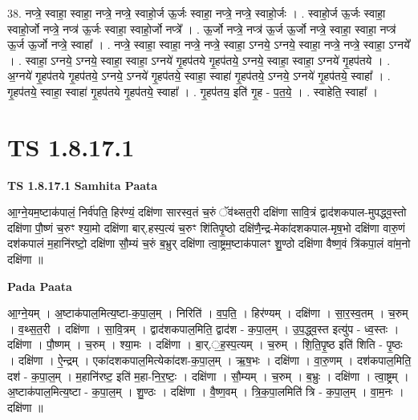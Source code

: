 \documentclass[17pt]{extarticle}
\begin{document}
38. नप्त्रे॒ स्वाहा॒ स्वाहा॒ नप्त्रे॒ नप्त्रे॒ स्वाहो॒र्ज ऊ॒र्जः स्वाहा॒ नप्त्रे॒ नप्त्रे॒ स्वाहो॒र्जः । . स्वाहो॒र्ज ऊ॒र्जः स्वाहा॒ स्वाहो॒र्जो नप्त्रे॒ नप्त्र॑ ऊ॒र्जः स्वाहा॒ स्वाहो॒र्जो नप्त्रे᳚ । . ऊ॒र्जो नप्त्रे॒ नप्त्र॑ ऊ॒र्ज ऊ॒र्जो नप्त्रे॒ स्वाहा॒ स्वाहा॒ नप्त्र॑ ऊ॒र्ज ऊ॒र्जो नप्त्रे॒ स्वाहा᳚ । . नप्त्रे॒ स्वाहा॒ स्वाहा॒ नप्त्रे॒ नप्त्रे॒ स्वाहा॒ ऽग्नये॒ ऽग्नये॒ स्वाहा॒ नप्त्रे॒ नप्त्रे॒ स्वाहा॒ ऽग्नये᳚ । . स्वाहा॒ ऽग्नये॒ ऽग्नये॒ स्वाहा॒ स्वाहा॒ ऽग्नये॑ गृ॒हप॑तये गृ॒हप॑तये॒ ऽग्नये॒ स्वाहा॒ स्वाहा॒ ऽग्नये॑ गृ॒हप॑तये । . अ॒ग्नये॑ गृ॒हप॑तये गृ॒हप॑तये॒ ऽग्नये॒ ऽग्नये॑ गृ॒हप॑तये॒ स्वाहा॒ स्वाहा॑ गृ॒हप॑तये॒ ऽग्नये॒ ऽग्नये॑ गृ॒हप॑तये॒ स्वाहा᳚ । . गृ॒हप॑तये॒ स्वाहा॒ स्वाहा॑ गृ॒हप॑तये गृ॒हप॑तये॒ स्वाहा᳚ । . गृ॒हप॑तय॒ इति॑ गृ॒ह - प॒त॒ये॒ । . स्वाहेति॒ स्वाहा᳚ । \newline
\pagebreak
{}

\section{ TS 1.8.17.1 }

\textbf{TS 1.8.17.1 } \newline
\textbf{Samhita Paata} \newline

आ॒ग्ने॒यम॒ष्टाक॑पालं॒ निर्व॑पति॒ हिर॑ण्यं॒ दक्षि॑णा सारस्व॒तं च॒रुं ॅव॑थ्सत॒री दक्षि॑णा सावि॒त्रं द्वाद॑शकपाल-मुपद्ध्व॒स्तो दक्षि॑णा पौ॒ष्णं च॒रुꣳ श्या॒मो दक्षि॑णा बार्.हस्प॒त्यं च॒रुꣳ शि॑तिपृ॒ष्ठो दक्षि॑णै॒न्द्र-मेका॑दशकपाल-मृष॒भो दक्षि॑णा वारु॒णं दश॑कपालं म॒हानि॑रष्टो॒ दक्षि॑णा सौ॒म्यं च॒रुं ब॒भ्रुर् दक्षि॑णा त्वा॒ष्ट्रम॒ष्टाक॑पालꣳ शु॒ण्ठो दक्षि॑णा वैष्ण॒वं त्रि॑कपा॒लं वा॑म॒नो दक्षि॑णा ॥ \newline

\textbf{Pada Paata} \newline

आ॒ग्ने॒यम् । अ॒ष्टाक॑पाल॒मित्य॒ष्टा-क॒पा॒ल॒म् । निरिति॑ । व॒प॒ति॒ । हिर॑ण्यम् । दक्षि॑णा । सा॒र॒स्व॒तम् । च॒रुम् । व॒थ्स॒त॒री । दक्षि॑णा । सा॒वि॒त्रम् । द्वाद॑शकपाल॒मिति॒ द्वाद॑श - क॒पा॒ल॒म् । उ॒प॒द्ध्व॒स्त इत्यु॑प - ध्व॒स्तः । दक्षि॑णा । पौ॒ष्णम् । च॒रुम् । श्या॒मः । दक्षि॑णा । बा॒र्.॒ह॒स्प॒त्यम् । च॒रुम् । शि॒ति॒पृ॒ष्ठ इति॑ शिति - पृ॒ष्ठः । दक्षि॑णा । ऐ॒न्द्रम् । एका॑दशकपाल॒मित्येका॑दश-क॒पा॒ल॒म् । ऋ॒ष॒भः । दक्षि॑णा । वा॒रु॒णम् । दश॑कपाल॒मिति॒ दश॑ - क॒पा॒ल॒म् । म॒हानि॑रष्ट॒ इति॑ म॒हा-नि॒र॒ष्टः॒ । दक्षि॑णा । सौ॒म्यम् । च॒रुम् । ब॒भ्रुः । दक्षि॑णा । त्वा॒ष्ट्रम् । अ॒ष्टाक॑पाल॒मित्य॒ष्टा - क॒पा॒ल॒म् । शु॒ण्ठः । दक्षि॑णा । वै॒ष्ण॒वम् । त्रि॒क॒पा॒लमिति॑ त्रि - क॒पा॒ल॒म् । वा॒म॒नः । दक्षि॑णा ॥  \newline
\end{document}
